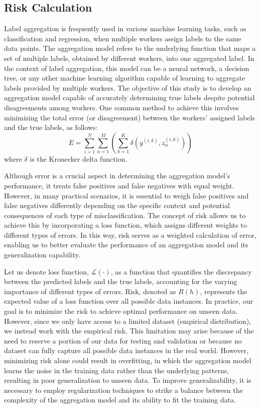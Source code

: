 \documentclass[sn-nature]{bst/sn-jnl}
\begin{document}
\subsection{Risk Calculation}
Label aggregation is frequently used in various machine learning tasks, such as classification and regression, when multiple workers assign labels to the same data points. The aggregation model refers to the underlying function that maps a set of multiple labels, obtained by different workers, into one aggregated label. In the context of label aggregation, this model can be a neural network, a decision tree, or any other machine learning algorithm capable of learning to aggregate labels provided by multiple workers. The objective of this study is to develop an aggregation model capable of accurately determining true labels despite potential disagreements among workers. One common method to achieve this involves minimizing the total error (or disagreement) between the workers' assigned labels and the true labels, as follows:
\begin{equation}
    E = \sum_{i=1}^N \sum_{a=1}^M \left( \sum_{k=1}^K \delta\left(y^{(i,k)}, z_\alpha^{(i,k)}\right) \right)
    \label{eq:crowd.Eq.1.risk.error}
\end{equation}
where $\delta $ is the Kronecker delta function.

Although error is a crucial aspect in determining the aggregation model's performance, it treats false positives and false negatives with equal weight. However, in many practical scenarios, it is essential to weigh false positives and false negatives differently depending on the specific context and potential consequences of each type of misclassification. The concept of risk allows us to achieve this by incorporating a loss function, which assigns different weights to different types of errors. In this way, risk serves as a weighted calculation of error, enabling us to better evaluate the performance of an aggregation model and its generalization capability.

Let us denote loss function, $\mathcal{L}(\cdot)$, as a function that quantifies the discrepancy between the predicted labels and the true labels, accounting for the varying importance of different types of errors. Risk, denoted as $R(h) $, represents the expected value of a loss function over all possible data instances.  In practice, our goal is to minimize the risk to achieve optimal performance on unseen data. However, since we only have access to a limited dataset (empirical distribution), we instead work with the empirical risk. This limitation may arise because of the need to reserve a portion of our data for testing and validation or because no dataset can fully capture all possible data instances in the real world. However, minimizing risk alone could result in overfitting, in which the aggregation model learns the noise in the training data rather than the underlying patterns, resulting in poor generalization to unseen data. To improve generalizability, it is necessary to employ regularization techniques to strike a balance between the complexity of the aggregation model and its ability to fit the training data.
\end{document}
